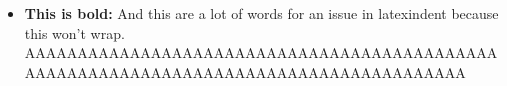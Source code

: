 \begin{itemize}

	\item \textbf{This is bold:} And this are a lot of words for an issue in latexindent
	      because this won't wrap.
	      AAAAAAAAAAAAAAAAAAAAAAAAAAAAAAAAAAAAAAAAAAAAAAAAAAAAAAAAAAAAAAAAAAAAAAAAAAAAAAAAAAAAAAA

\end{itemize}
